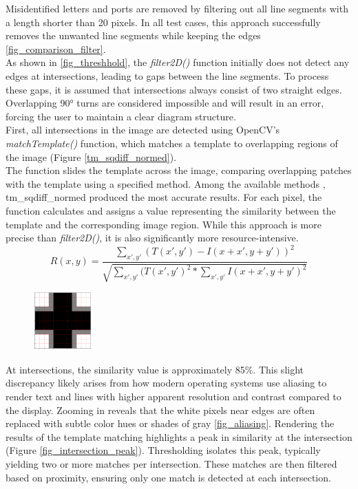 Misidentified letters and ports are removed by filtering out all line segments with a length shorter than 20 pixels. In all test cases, this approach successfully removes the unwanted line segments while keeping the edges \ref{fig_comparison_filter}.\\
As shown in \ref{fig_threshhold}, the \textit{filter2D()} function initially does not detect any edges at intersections, leading to gaps between the line segments. To process these gaps, it is assumed that intersections always consist of two straight edges. Overlapping 90° turns are considered impossible and will result in an error, forcing the user to maintain a clear diagram structure.\\
First, all intersections in the image are detected using OpenCV's \textit{matchTemplate()} function, which matches a template to overlapping regions of the image (Figure \ref{tm_sqdiff_normed}).\\
The function slides the template across the image, comparing overlapping patches with the template using a specified method. Among the available methods \cite{comparison_methods}, tm\_sqdiff\_normed produced the most accurate results. For each pixel, the function calculates and assigns a value representing the similarity between the template and the corresponding image region. While this approach is more precise than \textit{filter2D()}, it is also significantly more resource-intensive.
\begin{equation}
\label{tm_sqdiff_normed}
    R(x,y) = \frac{\sum_{x', y'}{(T(x', y') - I(x + x', y + y'))^2}}{\sqrt{\sum_{x', y'}{(T(x', y')^2 * \sum_{x', y'}{I(x + x', y + y')^2}}}}
\end{equation}
\begin{figure}
\centering
\includegraphics[width=0.2\textwidth]{Pictures/kernel_intersection.png}
\caption{\label{fig_cross}}
\end{figure}
At intersections, the similarity value is approximately 85\%. This slight discrepancy likely arises from how modern operating systems use aliasing to render text and lines with higher apparent resolution and contrast compared to the display. Zooming in reveals that the white pixels near edges are often replaced with subtle color hues or shades of gray \ref{fig_aliasing}. Rendering the results of the template matching highlights a peak in similarity at the intersection (Figure \ref{fig_intersection_peak}). Thresholding isolates this peak, typically yielding two or more matches per intersection. These matches are then filtered based on proximity, ensuring only one match is detected at each intersection.\\
